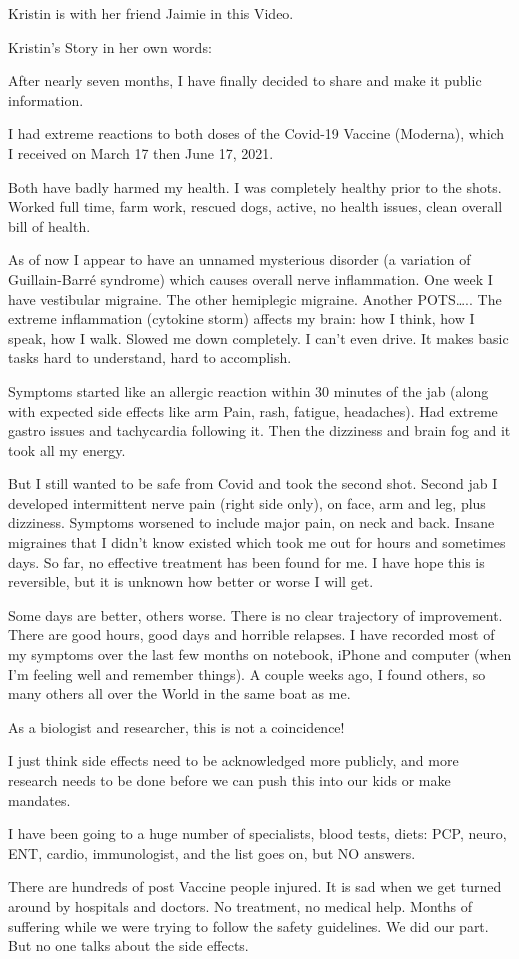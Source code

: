 Kristin is with her friend Jaimie in this Video.

Kristin’s Story in her own words:

After nearly seven months, I have finally decided to share and make it public
information.

I had extreme reactions to both doses of the Covid-19 Vaccine (Moderna), which I
received on March 17 then June 17, 2021.

Both have badly harmed my health. I was completely healthy prior to the
shots. Worked full time, farm work, rescued dogs, active, no health issues,
clean overall bill of health.

As of now I appear to have an unnamed mysterious disorder (a variation of
Guillain-Barré syndrome) which causes overall nerve inflammation. One week I
have vestibular migraine. The other hemiplegic migraine. Another POTS….. The
extreme inflammation (cytokine storm) affects my brain: how I think, how I
speak, how I walk. Slowed me down completely. I can’t even drive. It makes basic
tasks hard to understand, hard to accomplish.

Symptoms started like an allergic reaction within 30 minutes of the jab (along
with expected side effects like arm Pain, rash, fatigue, headaches). Had extreme
gastro issues and tachycardia following it. Then the dizziness and brain fog and
it took all my energy.

But I still wanted to be safe from Covid and took the second shot. Second jab I
developed intermittent nerve pain (right side only), on face, arm and leg, plus
dizziness. Symptoms worsened to include major pain, on neck and back. Insane
migraines that I didn’t know existed which took me out for hours and sometimes
days. So far, no effective treatment has been found for me. I have hope this is
reversible, but it is unknown how better or worse I will get.

Some days are better, others worse. There is no clear trajectory of
improvement. There are good hours, good days and horrible relapses. I have
recorded most of my symptoms over the last few months on notebook, iPhone and
computer (when I’m feeling well and remember things). A couple weeks ago, I
found others, so many others all over the World in the same boat as me.

As a biologist and researcher, this is not a coincidence!

I just think side effects need to be acknowledged more publicly, and more
research needs to be done before we can push this into our kids or make
mandates.

I have been going to a huge number of specialists, blood tests, diets: PCP,
neuro, ENT, cardio, immunologist, and the list goes on, but NO answers.

There are hundreds of post Vaccine people injured. It is sad when we get turned
around by hospitals and doctors. No treatment, no medical help. Months of
suffering while we were trying to follow the safety guidelines. We did our
part. But no one talks about the side effects.

